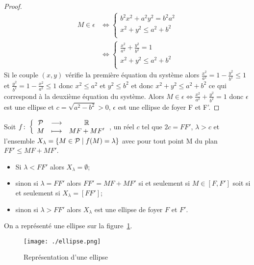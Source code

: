 \begin{proof}
\begin{align}
  M \in \epsilon & \iff \begin{cases} b^2x^2 +a^2y^2=b^2a^2 \\ x^2+y^2 \leq a^2 +b^2\\\end{cases}\\
  & \iff \begin{cases} \frac{x^2}{a^2} +\frac{y^2}{b^2}=1\\ x^2+y^2 \leq a^2 +b^2 \\\end{cases}
\end{align}
Si le couple $(x,y)$ vérifie la première équation du système alors $\frac{x^2}{a^2}=1-\frac{y^2}{b^2}\leq 1$ et $\frac{y^2}{b^2}=1-\frac{x^2}{a^2} \leq 1$ donc $x^2 \leq a^2$ et $y^2 \leq b^2$ et donc $x^2+y^2 \leq a^2+b^2$ ce qui correspond à la deuxième équation du système.
Alors $M \in \epsilon \iff \frac{x^2}{a^2} +\frac{y^2}{b^2}=1$ donc $\epsilon$ est une ellipse et $c=\sqrt{a^2-b^2}>0$, $\epsilon$ est une ellipse de foyer F et F'.
\end{proof}
Soit $f\colon \left\{\begin{array}{ccc} \mathcal{P} & \longrightarrow &\mathbb{R}\\ M & \longmapsto & MF+MF' \end{array} \right.$, un réel $c$ tel que $2c=FF'$, $\lambda>c$ et l'ensemble $X_\lambda=\left\{M \in \mathcal{P}\mathrel{}\middle|\mathrel{}f(M)=\lambda\right\}$ avec pour tout point M du plan $FF'\leq MF+MF'$.
\begin{itemize}
\item Si $\lambda < FF'$ alors $X_\lambda=\emptyset$;
\item sinon si $\lambda=FF'$ alors $FF'=MF+MF'$ si et seulement si $M \in [F,F']$ soit si et seulement si $X_\lambda=[FF']$;
\item sinon si $\lambda >FF'$ alors $X_\lambda$ est une ellipse de foyer $F$ et $F'$.
\end{itemize}

On a représenté une ellipse sur la figure~\ref{fig:ellipse}.

\begin{figure}[!h]
  \centering
  \texttt{[image: ./ellipse.png]}
  \caption{Représentation d'une ellipse}
  \label{fig:ellipse}
\end{figure}


